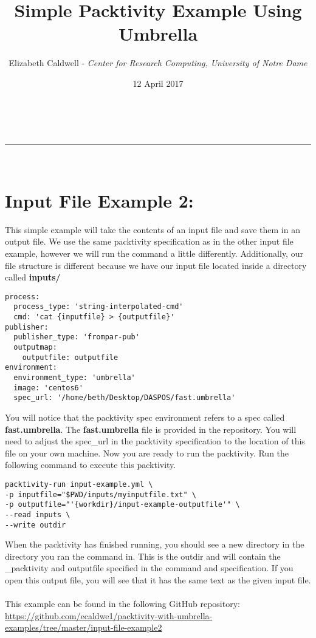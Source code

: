 \documentclass[a4paper,11pt]{article}
\makeatletter
\newcommand{\linia}{\rule{\linewidth}{0.5pt}}
\theoremstyle{mytheor}
\renewcommand{\maketitle}{
\begin{center}
\vspace{2ex}
{\huge \textsc{\@title}}
\vspace{1ex}
\\
\linia\\
\@author \hfill \@date
\vspace{4ex}
\end{center}
}
\makeatother
\begin{document}
\title{Simple Packtivity Example Using Umbrella}

\author{Elizabeth Caldwell - {\it Center for Research Computing, University of Notre Dame}}

\date{12 April 2017}

\maketitle

\section*{Input File Example 2: }
This simple example will take the contents of an input file and save them in an output file. We use the same packtivity specification as in the other input file example, however we will run the command a little differently. Additionally, our file structure is different because we have our input file located inside a directory called {\bf inputs/}
\begin{lstlisting}[label={list:first},caption=packtivity specification: inputfile-test.yml]
process:
  process_type: 'string-interpolated-cmd'
  cmd: 'cat {inputfile} > {outputfile}'
publisher:
  publisher_type: 'frompar-pub'
  outputmap:
    outputfile: outputfile
environment:
  environment_type: 'umbrella'
  image: 'centos6'
  spec_url: '/home/beth/Desktop/DASPOS/fast.umbrella'
\end{lstlisting}
You will notice that the packtivity spec environment refers to a spec called {\bf fast.umbrella}. The {\bf fast.umbrella} file is provided in the repository. You will need to adjust the spec\_url in the packtivity specification to the location of this file on your own machine.
Now you are ready to run the packtivity. Run the following command to execute this packtivity.
\begin{lstlisting}[label={list:first},caption=packtivity-run command]
packtivity-run input-example.yml \
-p inputfile="$PWD/inputs/myinputfile.txt" \
-p outputfile="'{workdir}/input-example-outputfile'" \
--read inputs \
--write outdir
\end{lstlisting}
When the packtivity has finished running, you should see a new directory in the directory you ran the command in. This is the outdir and will contain the _packtivity and outputfile specified in the command and specification. If you open this output file, you will see that it has the same text as the given input file.
\\\\This example can be found in the following GitHub repository: \\\url{https://github.com/ecaldwe1/packtivity-with-umbrella-examples/tree/master/input-file-example2}
\end{document}
